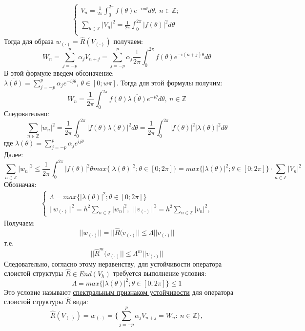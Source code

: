 \documentclass[__main__.tex]{subfiles}
\begin{document}
\begin{align*}
\begin{cases}
V_n = \frac{1}{2\pi}\int_{0}^{2\pi} f(\theta)e^{-in\theta}d\theta, \ n \in \mathbb{Z}; \\
\sum_{b \in \mathbb{Z}}|V_n|^2 =  \frac{1}{2\pi}\int_{0}^{2\pi} |f(\theta)|^2 d\theta\\
\end{cases}
\end{align*}
Тогда для образа $w_{(\cdot)}= \hat{R}(V_{(\cdot)})$ получаем: \\
$$ W_n = \sum_{j = -p}^{p}\alpha_jV_{n+j} = \sum_{j = -p}^{p}\alpha_j  \frac{1}{2\pi}\int_{0}^{2\pi} f(\theta)e^{-i(n+j)\theta}d\theta $$
В этой формуле введем обозначение: \\
$\overline{\lambda(\theta)} = \sum_{j = -p}^{p}\alpha_je^{-ij\theta}$, $\theta \in [0;w\pi].$
Тогда для этой формулы получим:\\
$$W_n = \frac{1}{2\pi}\int_{0}^{2\pi} f(\theta)\overline{ \lambda(\theta) }e^{-i\theta}d\theta ,\  n \in \mathbb{Z}$$
Следовательно:
$$\sum_{n \in \mathbb{Z}} |w_n|^2 = \frac{1}{2\pi} \int_{0}^{2\pi} |f(\theta) \lambda(\theta)|^2d\theta =   \frac{1}{2\pi} \int_{0}^{2\pi} |f(\theta)|^2 |\lambda(\theta)|^2 d\theta$$
где $ \lambda(\theta) = \sum_{j = -p}^{p}\alpha_je^{ij\theta}$ \\
Далее:
$$\sum_{n \in \mathbb{Z}} |w_n|^2 \leq   \frac{1}{2\pi} \int_{0}^{2\pi} |f(\theta)|^2\theta max\{ |\lambda(\theta)|^2  ; \theta \in [0;2\pi]\} 
=  max\{ |\lambda(\theta)|^2  ; \theta \in [0;2\pi]\}\cdot\sum_{n \in \mathbb{Z}}|V_n|^2$$
Обозначая:
\begin{align*}
\begin{cases}
\Lambda =  max\{ |\lambda(\theta)|^2  ; \theta \in [0;2\pi]\} \\
||w_{(\cdot)}||^2 = h^2 \sum_{n \in \mathbb{Z}}|w_n|^2, \ \ ||v_{(\cdot)}||^2 = h^2\sum_{n \in \mathbb{Z}}|v_n|^2,
\end{cases}
\end{align*}
Получаем:
$$||w_{(\cdot)}|| = ||\hat{R}(v_{(\cdot)}|| \leq \Lambda||v_{(\cdot)}||$$
т.е. \\
$$||\hat{R}^m(v_{(\cdot)}|| \leq \Lambda^m||v_{(\cdot)}||$$
Следовательно, согласно этому неравенству, для устойчивости оператора слоистой структуры $\hat{R} \in End(V_h)$ требуется выполнение условия:
$$\Lambda =  max\{ |\lambda(\theta)|^2  ; \theta \in [0;2\pi]\} \leq 1$$
Это условие называют \underline{спектральным признаком устойчивости} для оператора слоистой структуры $\hat{R}$ вида:
$$ \hat{R}(V_{(\cdot)}) = w_{(\cdot)} = \{ \sum_{j = -p}^{p} \alpha_j V_{n+j} = W_n : \ n \in \mathbb{Z}\},$$
\end{document}
